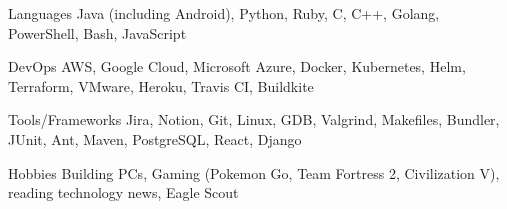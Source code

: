 

\begin{cvskills}


  \cvskill
    {Languages} %
    {Java (including Android), Python, Ruby, C, C++, Golang, PowerShell, Bash, JavaScript} %

  \cvskill
    {DevOps} %
    {AWS, Google Cloud, Microsoft Azure, Docker, Kubernetes, Helm, Terraform, VMware, Heroku, Travis CI, Buildkite} %
    
  \cvskill
    {Tools/Frameworks} %
    {Jira, Notion, Git, Linux, GDB, Valgrind, Makefiles, Bundler, JUnit, Ant, Maven, PostgreSQL, React, Django} %

  \cvskill
  {Hobbies} %
  {Building PCs, Gaming (Pokemon Go, Team Fortress 2, Civilization V), reading technology news, Eagle Scout} %

\end{cvskills}
